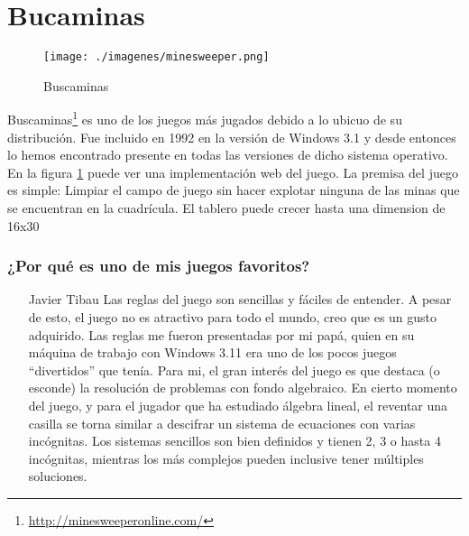 \section{Bucaminas}

\begin{figure}[htbp]
\begin{center}
\texttt{[image: ./imagenes/minesweeper.png]}
\caption{Buscaminas}
\label{Buscaminas}
\end{center}
\end{figure}
Buscaminas\footnote{\url{http://minesweeperonline.com/}} es uno de los juegos más jugados debido a lo ubicuo de su distribución. Fue incluido en 1992 en la versión de Windows 3.1 y desde entonces lo hemos encontrado presente en todas las versiones de dicho sistema operativo.
En la figura \ref{Buscaminas} puede ver una implementación web del juego.
La premisa del juego es simple: Limpiar el campo de juego sin hacer explotar ninguna de las minas que se encuentran en la cuadrícula.
El tablero puede crecer hasta una dimension de 16x30
\subsubsection{¿Por qué es uno de mis juegos favoritos?}
\begin{itemize}
\item[Javier Tibau] Las reglas del juego son sencillas y fáciles de entender. A pesar de esto, el juego no es atractivo para todo el mundo, creo que es un gusto adquirido. Las reglas me fueron presentadas por mi papá, quien en su máquina de trabajo con Windows 3.11 era uno de los pocos juegos ``divertidos'' que tenía. Para mi, el gran interés del juego es que destaca (o esconde) la resolución de problemas con fondo algebraico. En cierto momento del juego, y para el jugador que ha estudiado álgebra lineal, el reventar una casilla se torna similar a descifrar un sistema de ecuaciones con varias incógnitas. Los sistemas sencillos son bien definidos y tienen 2, 3 o hasta 4 incógnitas, mientras los más complejos pueden inclusive tener múltiples soluciones.
\end{itemize}
